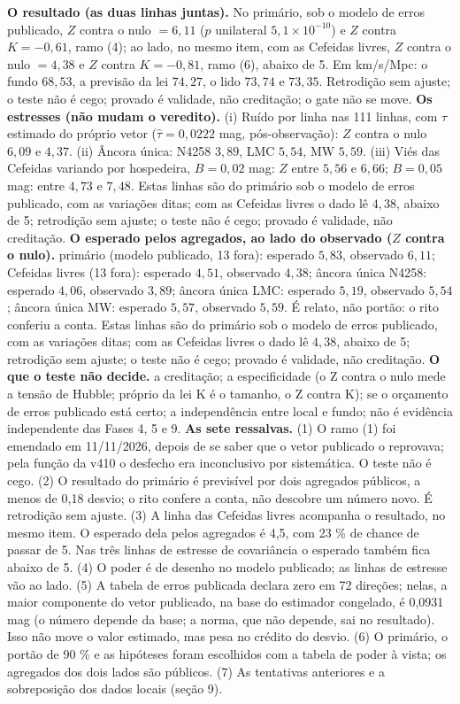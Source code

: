 \textbf{O resultado (as duas linhas juntas).} No primário, sob o modelo de erros publicado, $Z$ contra o nulo $=6{,}11$ ($p$ unilateral $5{,}1\times10^{-10}$) e $Z$ contra $K=-0{,}61$, ramo (4); ao lado, no mesmo item, com as Cefeidas livres, $Z$ contra o nulo $=4{,}38$ e $Z$ contra $K=-0{,}81$, ramo (6), abaixo de 5. Em km/s/Mpc: o fundo $68{,}53$, a previsão da lei $74{,}27$, o lido $73{,}74$ e $73{,}35$. Retrodição sem ajuste; o teste não é cego; provado é validade, não creditação; o gate não se move.
\textbf{Os estresses (não mudam o veredito).} (i) Ruído por linha nas 111 linhas, com $\tau$ estimado do próprio vetor ($\hat\tau=0{,}0222$ mag, pós-observação): $Z$ contra o nulo $6{,}09$ e $4{,}37$. (ii) Âncora única: N4258 $3{,}89$, LMC $5{,}54$, MW $5{,}59$. (iii) Viés das Cefeidas variando por hospedeira, $B=0{,}02$ mag: $Z$ entre $5{,}56$ e $6{,}66$; $B=0{,}05$ mag: entre $4{,}73$ e $7{,}48$. Estas linhas são do primário sob o modelo de erros publicado, com as variações ditas; com as Cefeidas livres o dado lê $4{,}38$, abaixo de 5; retrodição sem ajuste; o teste não é cego; provado é validade, não creditação.
\textbf{O esperado pelos agregados, ao lado do observado ($Z$ contra o nulo).} primário (modelo publicado, 13 fora): esperado $5{,}83$, observado $6{,}11$; Cefeidas livres (13 fora): esperado $4{,}51$, observado $4{,}38$; âncora única N4258: esperado $4{,}06$, observado $3{,}89$; âncora única LMC: esperado $5{,}19$, observado $5{,}54$; âncora única MW: esperado $5{,}57$, observado $5{,}59$. É relato, não portão: o rito conferiu a conta. Estas linhas são do primário sob o modelo de erros publicado, com as variações ditas; com as Cefeidas livres o dado lê $4{,}38$, abaixo de 5; retrodição sem ajuste; o teste não é cego; provado é validade, não creditação.
\textbf{O que o teste não decide.} a creditação; a especificidade (o Z contra o nulo mede a tensão de Hubble; próprio da lei K é o tamanho, o Z contra K); se o orçamento de erros publicado está certo; a independência entre local e fundo; não é evidência independente das Fases 4, 5 e 9.
\textbf{As sete ressalvas.} (1) O ramo (1) foi emendado em 11/11/2026, depois de se saber que o vetor publicado o reprovava; pela função da v410 o desfecho era inconclusivo por sistemática. O teste não é cego. (2) O resultado do primário é previsível por dois agregados públicos, a menos de 0,18 desvio; o rito confere a conta, não descobre um número novo. É retrodição sem ajuste. (3) A linha das Cefeidas livres acompanha o resultado, no mesmo item. O esperado dela pelos agregados é 4,5, com 23 \% de chance de passar de 5. Nas três linhas de estresse de covariância o esperado também fica abaixo de 5. (4) O poder é de desenho no modelo publicado; as linhas de estresse vão ao lado. (5) A tabela de erros publicada declara zero em 72 direções; nelas, a maior componente do vetor publicado, na base do estimador congelado, é 0,0931 mag (o número depende da base; a norma, que não depende, sai no resultado). Isso não move o valor estimado, mas pesa no crédito do desvio. (6) O primário, o portão de 90 \% e as hipóteses foram escolhidos com a tabela de poder à vista; os agregados dos dois lados são públicos. (7) As tentativas anteriores e a sobreposição dos dados locais (seção 9).
